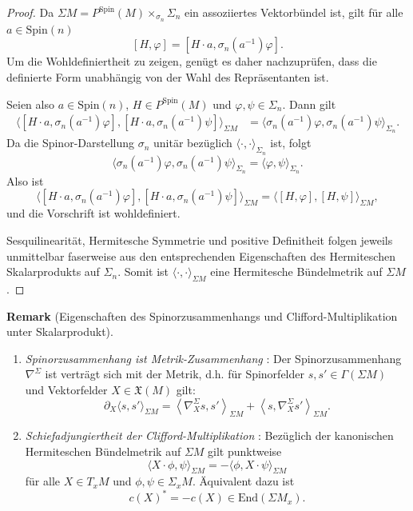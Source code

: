 \documentclass[10pt, letterpaper]{article}
\newcommand{\End}{\mathrm{End}}
\newcommand{\Spin}{\mathrm{Spin}}
\newcommand{\CustomHeading}[3]{%
  \par\medskip\noindent%
  \textbf{#1 #2} \textnormal{(#3)}.\enskip%
}
\newenvironment{REM}[2]{\CustomHeading{Remark}{#1}{#2}}{}
\begin{document}
\begin{proof}
Da \(\Sigma M=P^{\Spin}(M)\times_{\sigma_n}\Sigma_n\) ein assoziiertes
Vektorbündel ist, gilt für alle \(a\in \Spin(n)\)
\[
[H,\varphi]=[H\cdot a,\sigma_n(a^{-1})\varphi].
\]
Um die Wohldefiniertheit zu zeigen, genügt es daher nachzuprüfen, dass die
definierte Form unabhängig von der Wahl des Repräsentanten ist.

Seien also \(a\in \Spin(n)\), \(H\in P^{\Spin}(M)\) und \(\varphi,\psi\in \Sigma_n\).
Dann gilt
\[
\begin{aligned}
\bigl\langle [H\cdot a,\sigma_n(a^{-1})\varphi],
[H\cdot a,\sigma_n(a^{-1})\psi]\bigr\rangle_{\Sigma M}
&=
\bigl\langle \sigma_n(a^{-1})\varphi,\sigma_n(a^{-1})\psi\bigr\rangle_{\Sigma_n}.
\end{aligned}
\]
Da die Spinor-Darstellung \(\sigma_n\) unitär bezüglich
\(\langle\cdot,\cdot\rangle_{\Sigma_n}\) ist, folgt
\[
\bigl\langle \sigma_n(a^{-1})\varphi,\sigma_n(a^{-1})\psi\bigr\rangle_{\Sigma_n}
=
\langle \varphi,\psi\rangle_{\Sigma_n}.
\]
Also ist
\[
\bigl\langle [H\cdot a,\sigma_n(a^{-1})\varphi],
[H\cdot a,\sigma_n(a^{-1})\psi]\bigr\rangle_{\Sigma M}
=
\bigl\langle [H,\varphi],[H,\psi]\bigr\rangle_{\Sigma M},
\]
und die Vorschrift ist wohldefiniert.

Sesquilinearität, Hermitesche Symmetrie und positive Definitheit folgen jeweils
unmittelbar faserweise aus den entsprechenden Eigenschaften des Hermiteschen
Skalarprodukts auf \(\Sigma_n\). Somit ist \(\langle\cdot,\cdot\rangle_{\Sigma M}\)
eine Hermitesche Bündelmetrik auf \(\Sigma M\).
\end{proof}




\begin{REM}{}{Eigenschaften des Spinorzusammenhangs und Clifford-Multiplikation unter Skalarprodukt}
    \begin{enumerate}
        \item \emph{Spinorzusammenhang ist Metrik-Zusammenhang} \parencite[102]{BaerSpin}: Der Spinorzusammenhang $\nabla^\Sigma$ ist verträgt sich mit der Metrik, d.h. für Spinorfelder $s,s'\in\Gamma(\Sigma M)$ und Vektorfelder $X\in\mathfrak{X}(M)$ gilt:
        $$
        \partial_X\langle s, s'\rangle_{\Sigma M}=\left\langle\nabla_X^{\Sigma} s, s'\right\rangle_{\Sigma M}+\left\langle s, \nabla_X^{\Sigma} s'\right\rangle _{\Sigma M}.
        $$
        \item \emph{Schiefadjungiertheit der Clifford-Multiplikation} \parencite[103]{BaerSpin}: Bezüglich der kanonischen Hermiteschen Bündelmetrik auf \(\Sigma M\) gilt
        punktweise
        \[ \langle X\cdot \phi,\psi\rangle_{\Sigma M} = -\langle \phi, X\cdot \psi\rangle_{\Sigma M}\]
        für alle \(X\in T_xM\) und \(\phi,\psi\in \Sigma_xM\). Äquivalent dazu ist
        \[
        c(X)^*=-c(X)\in \End(\Sigma M_x).
        \]
    \end{enumerate}
\end{REM}
\end{document}
